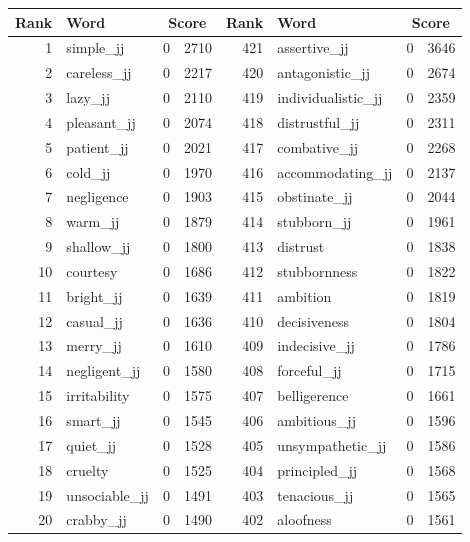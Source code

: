 \begin{table}[tbp]
    \begin{tabular}{| rlr@{.}l | rlr@{.}l |}
    \hline
    \textbf{Rank} & \textbf{Word} & \multicolumn{2}{c|}{\textbf{Score}} & \textbf{Rank} & \textbf{Word} & \multicolumn{2}{c|}{\textbf{Score}} \\
    \hline
    1 & simple\_jj & 0 & 2710    &    421 & assertive\_jj & 0 & 3646 \\
    2 & careless\_jj & 0 & 2217    &    420 & antagonistic\_jj & 0 & 2674 \\
    3 & lazy\_jj & 0 & 2110    &    419 & individualistic\_jj & 0 & 2359 \\
    4 & pleasant\_jj & 0 & 2074    &    418 & distrustful\_jj & 0 & 2311 \\
    5 & patient\_jj & 0 & 2021    &    417 & combative\_jj & 0 & 2268 \\
    6 & cold\_jj & 0 & 1970    &    416 & accommodating\_jj & 0 & 2137 \\
    7 & negligence & 0 & 1903    &    415 & obstinate\_jj & 0 & 2044 \\
    8 & warm\_jj & 0 & 1879    &    414 & stubborn\_jj & 0 & 1961 \\
    9 & shallow\_jj & 0 & 1800    &    413 & distrust & 0 & 1838 \\
    10 & courtesy & 0 & 1686    &    412 & stubbornness & 0 & 1822 \\
    11 & bright\_jj & 0 & 1639    &    411 & ambition & 0 & 1819 \\
    12 & casual\_jj & 0 & 1636    &    410 & decisiveness & 0 & 1804 \\
    13 & merry\_jj & 0 & 1610    &    409 & indecisive\_jj & 0 & 1786 \\
    14 & negligent\_jj & 0 & 1580    &    408 & forceful\_jj & 0 & 1715 \\
    15 & irritability & 0 & 1575    &    407 & belligerence & 0 & 1661 \\
    16 & smart\_jj & 0 & 1545    &    406 & ambitious\_jj & 0 & 1596 \\
    17 & quiet\_jj & 0 & 1528    &    405 & unsympathetic\_jj & 0 & 1586 \\
    18 & cruelty & 0 & 1525    &    404 & principled\_jj & 0 & 1568 \\
    19 & unsociable\_jj & 0 & 1491    &    403 & tenacious\_jj & 0 & 1565 \\
    20 & crabby\_jj & 0 & 1490    &    402 & aloofness & 0 & 1561 \\

\end{tabular}
\end{table}
